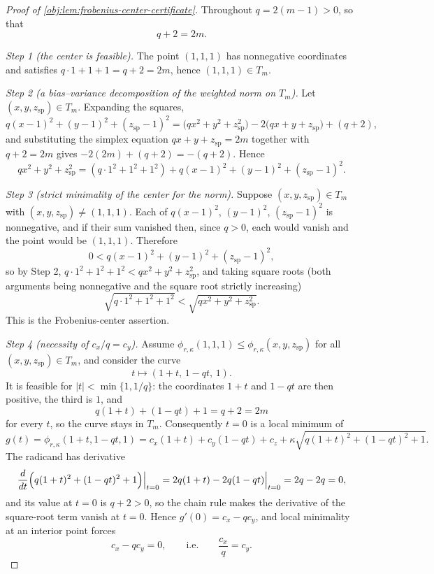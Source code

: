 \begin{proof}[Proof of \cref{obj:lem:frobenius-center-certificate}]
Throughout \(q=2(m-1)>0\), so that
\[
q+2=2m .
\]

\emph{Step 1 (the center is feasible).}  The point \((1,1,1)\) has nonnegative coordinates and satisfies \(q\cdot1+1+1=q+2=2m\), hence \((1,1,1)\in T_m\). %

\emph{Step 2 (a bias--variance decomposition of the weighted norm on \(T_m\)).}  Let \((x,y,z_{\mathrm{sp}})\in T_m\).  Expanding the squares,
\[
q(x-1)^2+(y-1)^2+(z_{\mathrm{sp}}-1)^2
=\bigl(qx^2+y^2+z_{\mathrm{sp}}^2\bigr)
-2\bigl(qx+y+z_{\mathrm{sp}}\bigr)+(q+2),
\]
and substituting the simplex equation \(qx+y+z_{\mathrm{sp}}=2m\) together with \(q+2=2m\) gives \(-2(2m)+(q+2)=-(q+2)\).  Hence
\[
qx^2+y^2+z_{\mathrm{sp}}^2
=(q\cdot1^2+1^2+1^2)+q(x-1)^2+(y-1)^2+(z_{\mathrm{sp}}-1)^2 .
\]

\emph{Step 3 (strict minimality of the center for the norm).}  Suppose \((x,y,z_{\mathrm{sp}})\in T_m\) with \((x,y,z_{\mathrm{sp}})\ne(1,1,1)\).  Each of \(q(x-1)^2\), \((y-1)^2\), \((z_{\mathrm{sp}}-1)^2\) is nonnegative, and if their sum vanished then, since \(q>0\), each would vanish and the point would be \((1,1,1)\).  Therefore
\[
0<q(x-1)^2+(y-1)^2+(z_{\mathrm{sp}}-1)^2 ,
\]
so by Step 2, \(q\cdot1^2+1^2+1^2<qx^2+y^2+z_{\mathrm{sp}}^2\), and taking square roots (both arguments being nonnegative and the square root strictly increasing)
\[
\sqrt{q\cdot1^2+1^2+1^2}<\sqrt{qx^2+y^2+z_{\mathrm{sp}}^2}.
\]
This is the Frobenius-center assertion. %

\emph{Step 4 (necessity of \(c_x/q=c_y\)).}  Assume \(\phi_{r,\kappa}(1,1,1)\le\phi_{r,\kappa}(x,y,z_{\mathrm{sp}})\) for all \((x,y,z_{\mathrm{sp}})\in T_m\), and consider the curve
\[
t\longmapsto(1+t,\,1-qt,\,1).
\]
It is feasible for \(|t|<\min\{1,1/q\}\): the coordinates \(1+t\) and \(1-qt\) are then positive, the third is \(1\), and
\[
q(1+t)+(1-qt)+1=q+2=2m
\]
for every \(t\), so the curve stays in \(T_m\).  Consequently \(t=0\) is a local minimum of
\[
g(t)=\phi_{r,\kappa}(1+t,1-qt,1)
=c_x(1+t)+c_y(1-qt)+c_z
+\kappa\sqrt{q(1+t)^2+(1-qt)^2+1}.
\]
The radicand has derivative
\[
\frac{d}{dt}\Bigl(q(1+t)^2+(1-qt)^2+1\Bigr)\Big|_{t=0}
=2q(1+t)-2q(1-qt)\Big|_{t=0}=2q-2q=0,
\]
and its value at \(t=0\) is \(q+2>0\), so the chain rule makes the derivative of the square-root term vanish at \(t=0\).  Hence \(g'(0)=c_x-qc_y\), and local minimality at an interior point forces
\[
c_x-qc_y=0,
\qquad\text{i.e.}\qquad
\frac{c_x}{q}=c_y .
\]


\end{proof}
